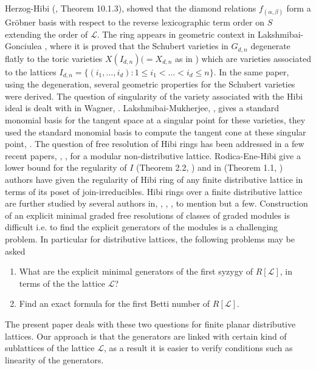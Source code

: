 \documentclass[10pt,reqno]{amsart}
\numberwithin{equation}{section}
\begin{document}
  Herzog-Hibi (\cite{herzog_monomial}, Theorem 10.1.3), showed that
the diamond
relations $f_{(\alpha,\beta)}$ form a Gr\"{o}bner basis with respect to the reverse lexicographic term order on $S$ extending the order of $\mathcal{L}$.
The ring appears in  geometric context in Lakshmibai-Gonciulea \cite{gonciulea_singular}, where it is proved that
the Schubert varieties in $G_{d,n}$ degenerate flatly to the toric varieties
 $X(I_{d,n})(=X_{d,n}$ as in \cite{gonciulea_singular}) which are varieties associated to the lattices $I_{d,n}=\{
 (i_1,\ldots,i_d): 1 \leq i_1 < \ldots < i_d \leq n\}$. In the same paper, using the degeneration, several geometric properties for the
 Schubert varieties were derived. The
 question of singularity of the variety associated with the Hibi ideal is dealt with in Wagner, \cite{wagner_singularities}.  Lakshmibai-Mukherjee, \cite{himadri}, gives a standard monomial basis for the tangent space at a singular point for these varieties, they used the standard monomial basis to compute the tangent cone at these singular point, \cite{himadri_thesis}. The question of free resolution of Hibi rings has been addressed in a few recent papers, \cite{ene_syzygies}, \cite{hibi_reg}, for a  modular non-distributive lattice. Rodica-Ene-Hibi give a lower bound for the regularity of $I$ (Theorem 2.2, \cite{hibi_reg}) and in (Theorem 1.1, \cite{herzog} ) authors have given the regularity of Hibi ring of any finite distributive lattice in terms of its poset of join-irreducibles.
 Hibi rings over a finite distributive lattice are further studied by several authors in, \cite{aramova}, \cite{brown_singular}, \cite{brown-lucky}, \cite{ene_join} to mention but a few. 
 Construction of an explicit minimal graded free resolutions of classes of graded modules is difficult \cite{peeva_graded} i.e. to find the explicit generators of the modules is a challenging problem. In particular for distributive lattices, the following problems may be asked 
\begin{enumerate}
  \item What are the explicit minimal generators of the first syzygy of $R[\mathcal{L}]$, in terms of the the lattice $\mathcal{L}$? 
  \item Find an exact formula for the first Betti number of $R[\mathcal{L}]$.
 \end{enumerate}
 The present paper deals with these two questions for finite planar distributive lattices. Our approach is that the generators are linked with certain kind of sublattices of the lattice $\mathcal{L}$, as a result it is easier to verify conditions such as linearity of the generators. 
\end{document}
